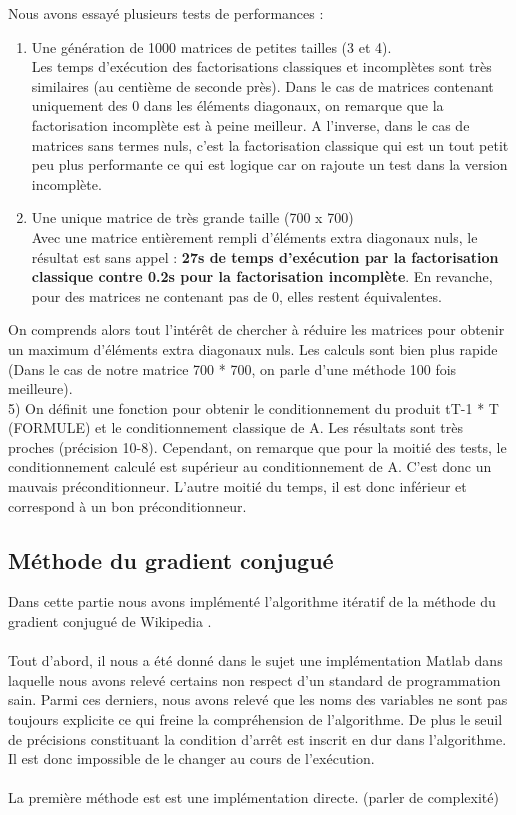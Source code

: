 \documentclass{article}
\begin{document}
  Nous avons essayé plusieurs tests de performances :
  \begin{enumerate}
      \item Une génération de 1000 matrices de petites tailles (3 et 4). \\
      Les temps d'exécution des factorisations classiques et incomplètes sont très similaires (au centième de seconde près).
      Dans le cas de matrices contenant uniquement des 0 dans les éléments diagonaux, on remarque que la factorisation incomplète est à peine meilleur. A l'inverse, dans le cas de matrices sans termes nuls, c'est la factorisation classique qui est un tout petit peu plus performante ce qui est logique car on rajoute un test dans la version incomplète. \\
      
      \item Une unique matrice de très grande taille (700 x 700) \\
      Avec une matrice entièrement rempli d'éléments extra diagonaux nuls, le résultat est sans appel : \textbf{27s de temps d'exécution par la factorisation classique contre 0.2s pour la factorisation incomplète}.
      En revanche, pour des matrices ne contenant pas de 0, elles restent équivalentes.
  \end{enumerate}
  
  On comprends alors tout l'intérêt de chercher à réduire les matrices pour obtenir un maximum d'éléments extra diagonaux nuls. Les calculs sont bien plus rapide (Dans le cas de notre matrice 700 * 700, on parle d'une méthode 100 fois meilleure). \\
  
5)
On définit une fonction pour obtenir le conditionnement du produit tT-1 * T (FORMULE) et le conditionnement classique de A. Les résultats sont très proches (précision 10-8). Cependant, on remarque que pour la moitié des tests, le conditionnement calculé est supérieur au conditionnement de A. C'est donc un mauvais préconditionneur. L'autre moitié du temps, il est donc inférieur et correspond à un bon préconditionneur.


    
\subsection*{Méthode du gradient conjugué}
    Dans cette partie nous avons implémenté l'algorithme itératif de la méthode du gradient conjugué de Wikipedia \cite{gradconjugwiki}.
    \\ \\
    Tout d'abord, il nous a été donné dans le sujet une implémentation Matlab dans laquelle nous avons relevé certains non respect d'un standard de programmation sain. Parmi ces derniers, nous avons relevé que les noms des variables ne sont pas toujours explicite ce qui freine la compréhension de l'algorithme. De plus le seuil de précisions constituant la condition d'arrêt est inscrit en dur dans l'algorithme. Il est donc impossible de le changer au cours de l'exécution.
    \\ \\
    La première méthode est est une implémentation directe. (parler de complexité)
\end{document}
